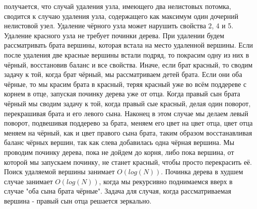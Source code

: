 получается, что случай удаления узла, имеющего два нелистовых потомка, сводится к случаю удаления узла, содержащего как максимум один дочерний нелистовой узел. Удаление 
чёрного узла может нарушить свойства 2, 4 и 5. Удаление красного узла не требует починки дерева. При удалении будем рассматривать брата вершины, которая встала на место
удаленной вершины. Если после удаления две красные вершины встали подряд, то покрасим одну из них в чёрный, восстановив баланс и все свойства. Иначе, если брат красный,
то сводим задачу к той, когда брат чёрный, мы рассматриваем детей брата. Если они оба чёрные, то мы красим брата в красный, теряя красный уже во всём поддереве с корнем
в отце, запуская починку дерева уже от отца. Когда правый сын брата чёрный мы сводим задачу к той, когда правый сые красный, делая один поворот, перекрашивая брата и его 
левого сына. Наконец в этом случае мы делаем левый поворот, подвешивая поддерево за брата, меняем его цвет на цвет отца, цвет отца меняем на чёрный, как и цвет правого 
сына брата, таким образом восстанавливая баланс чёрных вершин, так как слева добавилась одна чёрная вершина. Мы проводим починку дерева, пока не дойдем до корня, либо пока
вершина, от которой мы запускаем починку, не станет красный, чтобы просто перекрасить её. Поиск удаляемой вершины занимает $O(log(N))$. Починка дерева в худшем случае занимает 
$O(log(N))$, когда мы рекурсивно поднимаемся вверх в случае "оба сына брата чёрные". Задача для случая, когда рассматриваемая вершина - правый сын отца решается зеркально.
\pagebreak

